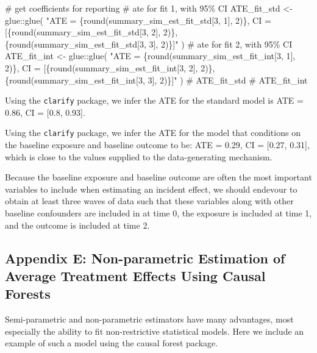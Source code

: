 \documentclass[
  singlecolumn]{article}
\newenvironment{Shaded}{\begin{snugshade}}{\end{snugshade}}
\newcommand{\CommentTok}[1]{\textcolor[rgb]{0.37,0.37,0.37}{#1}}
\newcommand{\FunctionTok}[1]{\textcolor[rgb]{0.28,0.35,0.67}{#1}}
\newcommand{\NormalTok}[1]{\textcolor[rgb]{0.00,0.23,0.31}{#1}}
\newcommand{\OtherTok}[1]{\textcolor[rgb]{0.00,0.23,0.31}{#1}}
\newcommand{\SpecialCharTok}[1]{\textcolor[rgb]{0.37,0.37,0.37}{#1}}
\newcommand{\StringTok}[1]{\textcolor[rgb]{0.13,0.47,0.30}{#1}}
\begin{document}
\begin{Shaded}
\begin{Highlighting}[]
\CommentTok{\# get coefficients for reporting}
\CommentTok{\# ate for fit 1, with 95\% CI}
\NormalTok{ATE\_fit\_std }\OtherTok{\textless{}{-}}\NormalTok{ glue}\SpecialCharTok{::}\FunctionTok{glue}\NormalTok{(}
  \StringTok{"ATE = \{round(summary\_sim\_est\_fit\_std[3, 1], 2)\}, }
\StringTok{  CI = [\{round(summary\_sim\_est\_fit\_std[3, 2], 2)\},}
\StringTok{  \{round(summary\_sim\_est\_fit\_std[3, 3], 2)\}]"}
\NormalTok{)}
\CommentTok{\# ate for fit 2, with 95\% CI}
\NormalTok{ATE\_fit\_int }\OtherTok{\textless{}{-}}
\NormalTok{  glue}\SpecialCharTok{::}\FunctionTok{glue}\NormalTok{(}
    \StringTok{"ATE = \{round(summary\_sim\_est\_fit\_int[3, 1], 2)\},}
\StringTok{    CI = [\{round(summary\_sim\_est\_fit\_int[3, 2], 2)\},}
\StringTok{    \{round(summary\_sim\_est\_fit\_int[3, 3], 2)\}]"}
\NormalTok{  )}
\CommentTok{\# ATE\_fit\_std}
\CommentTok{\# ATE\_fit\_int}
\end{Highlighting}
\end{Shaded}

Using the \texttt{clarify} package, we infer the ATE for the standard
model is ATE = 0.86, CI = {[}0.8, 0.93{]}.

Using the \texttt{clarify} package, we infer the ATE for the model that
conditions on the baseline exposure and baseline outcome to be: ATE =
0.29, CI = {[}0.27, 0.31{]}, which is close to the values supplied to
the data-generating mechanism.

Because the baseline exposure and baseline outcome are often the most
important variables to include when estimating an incident effect, we
should endevour to obtain at least three waves of data such that these
variables along with other baseline confounders are included in at time
0, the exposure is included at time 1, and the outcome is included at
time 2.

\subsection{Appendix E: Non-parametric Estimation of Average Treatment
Effects Using Causal
Forests}\label{appendix-e-non-parametric-estimation-of-average-treatment-effects-using-causal-forests}

Semi-parametric and non-parametric estimators have many advantages, most
especially the ability to fit non-restrictive statistical models. Here
we include an example of such a model using the causal forest package.
\end{document}
